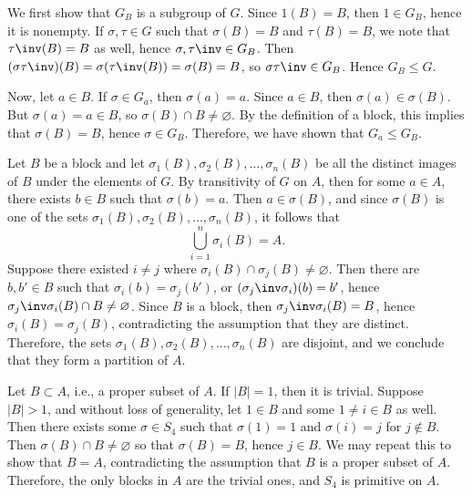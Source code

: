 \begin{solalph}
	\item We first show that $G_B$ is a subgroup of $G$. Since $1(B) = B$, then $1 \in G_B$, hence it is nonempty. If $\sigma, \tau \in G$ such that $\sigma(B) = B$ and $\tau(B) = B$, we note that $\tau\inv(B) = B$ as well, hence $\sigma, \tau\inv \in G_B$. Then $(\sigma\tau\inv)(B) = \sigma(\tau\inv(B)) = \sigma(B) = B$, so $\sigma\tau\inv \in G_B$. Hence $G_B \leq G$.
	
	Now, let $a \in B$. If $\sigma \in G_a$, then $\sigma(a) = a$. Since $a \in B$, then $\sigma(a) \in \sigma(B)$. But $\sigma(a) = a \in B$, so $\sigma(B) \cap B \neq \varnothing$. By the definition of a block, this implies that $\sigma(B) = B$, hence $\sigma \in G_B$. Therefore, we have shown that $G_a \leq G_B$.
	\item Let $B$ be a block and let $\sigma_1(B), \sigma_2(B), \ldots, \sigma_n(B)$ be all the distinct images of $B$ under the elements of $G$. By transitivity of $G$ on $A$, then for some $a \in A$, there exists $b \in B$ such that $\sigma(b) = a$. Then $a \in \sigma(B)$, and since $\sigma(B)$ is one of the sets $\sigma_1(B), \sigma_2(B), \ldots, \sigma_n(B)$, it follows that
	\[\bigcup_{i=1}^n \sigma_i(B) = A.\]
	Suppose there existed $i \neq j$ where $\sigma_i(B) \cap \sigma_j(B) \neq \varnothing$. Then there are $b, b' \in B$ such that $\sigma_i(b) = \sigma_j(b')$, or $(\sigma_j\inv\sigma_i)(b) = b'$, hence $\sigma_j\inv\sigma_i(B) \cap B \neq \varnothing$. Since $B$ is a block, then $\sigma_j\inv\sigma_i(B) = B$, hence $\sigma_i(B) = \sigma_j(B)$, contradicting the assumption that they are distinct. Therefore, the sets $\sigma_1(B), \sigma_2(B), \ldots, \sigma_n(B)$ are disjoint, and we conclude that they form a partition of $A$.
	\item Let $B \subset A$, i.e., a proper subset of $A$. If $|B| = 1$, then it is trivial. Suppose $|B| > 1$, and without loss of generality, let $1 \in B$ and some $1 \neq i \in B$ as well. Then there exists some $\sigma \in S_4$ such that $\sigma(1) = 1$ and $\sigma(i) = j$ for $j \not\in B$. Then $\sigma(B) \cap B \neq \varnothing$ so that $\sigma(B) = B$, hence $j \in B$. We may repeat this to show that $B = A$, contradicting the assumption that $B$ is a proper subset of $A$. Therefore, the only blocks in $A$ are the trivial ones, and $S_4$ is primitive on $A$.
	

\end{solalph}
